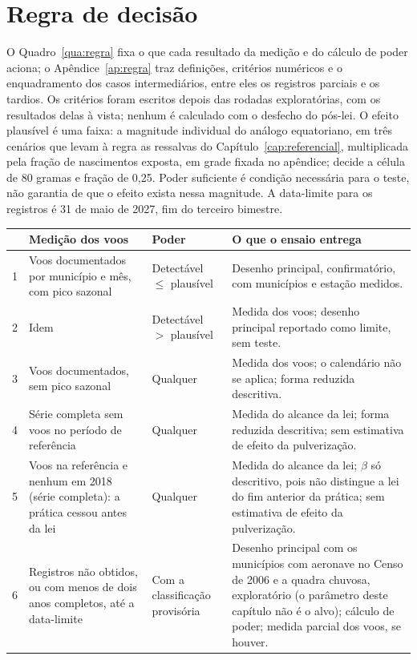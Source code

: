 \section{Regra de decisão}
\label{sec:regra}

O Quadro~\ref{qua:regra} fixa o que cada resultado da medição e do cálculo de
poder aciona; o Apêndice~\ref{ap:regra} traz definições, critérios numéricos
e o enquadramento dos casos intermediários, entre eles os registros parciais
e os tardios. Os critérios foram escritos depois das rodadas exploratórias,
com os resultados delas à vista; nenhum é calculado com o desfecho do pós-lei. O efeito plausível é uma faixa: a
magnitude individual do análogo equatoriano, em três cenários que levam à
regra as ressalvas do Capítulo~\ref{cap:referencial}, multiplicada pela fração
de nascimentos exposta, em grade fixada no apêndice; decide a célula de 80
gramas e fração de 0,25.
Poder suficiente é condição necessária para o teste, não garantia de que o
efeito exista nessa magnitude. A data-limite para os registros é 31 de maio de
2027, fim do terceiro bimestre.

\begin{quadro}[htb]
\caption{\label{qua:regra}Regra de decisão}
\centering
\footnotesize
\begin{tabular}{@{}p{0.3cm}p{4.4cm}p{2.6cm}p{7.3cm}@{}}
\toprule
 & Medição dos voos & Poder & O que o ensaio entrega \\
\midrule
1 & Voos documentados por município e mês, com pico sazonal & Detectável $\leq$ plausível &
Desenho principal, confirmatório, com municípios e estação medidos. \\
2 & Idem & Detectável $>$ plausível &
Medida dos voos; desenho principal reportado como limite, sem teste. \\
3 & Voos documentados, sem pico sazonal & Qualquer &
Medida dos voos; o calendário não se aplica; forma reduzida descritiva. \\
4 & Série completa sem voos no período de referência & Qualquer &
Medida do alcance da lei; forma reduzida descritiva; sem estimativa de efeito da pulverização. \\
5 & Voos na referência e nenhum em 2018 (série completa): a prática cessou antes da lei & Qualquer &
Medida do alcance da lei; $\beta$ só descritivo, pois não distingue a lei do fim anterior da prática; sem estimativa de efeito da pulverização. \\
6 & Registros não obtidos, ou com menos de dois anos completos, até a data-limite & Com a classificação provisória &
Desenho principal com os municípios com aeronave no Censo de 2006 e a quadra chuvosa, exploratório (o parâmetro deste capítulo não é o alvo); cálculo de poder; medida parcial dos voos, se houver. \\
\bottomrule
\end{tabular}
\end{quadro}

